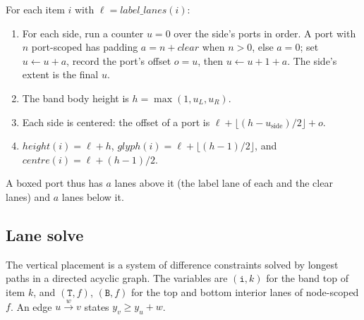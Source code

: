 \begin{algorithm}[Bands]\label{alg:pictorial-bands}
For each item $i$ with $\ell = \mathit{label\_lanes}(i)$:
\begin{enumerate}
  \item For each side, run a counter $u=0$ over the side's ports in order. A port with
    $n$ port-scoped \bboxes{} has padding $a = n + \mathit{clear}$ when $n>0$, else $a=0$; set
    $u \gets u + a$, record the port's offset $o = u$, then $u\gets u + 1 + a$. The side's
    extent is the final $u$.
  \item The band body height is $h = \max(1, u_L, u_R)$.
  \item Each side is centered: the offset of a port is $\ell + \lfloor(h - u_\text{side})/2\rfloor
    + o$.
  \item $\mathit{height}(i) = \ell + h$, $\mathit{glyph}(i) = \ell + \lfloor (h-1)/2\rfloor$,
    and $\mathit{centre}(i) = \ell + (h-1)/2$.
\end{enumerate}
A boxed port thus has $a$ lanes above it (the label lane of each \bbox{} and the clear lanes)
and $a$ lanes below it.
\end{algorithm}

\subsection{Lane solve}\label{sec:pictorial-solve}

The vertical placement is a system of difference constraints solved by longest paths in a
directed acyclic graph. The variables are $(\mathtt{i}, k)$ for the band top of item $k$, and
$(\mathtt{T}, f)$, $(\mathtt{B}, f)$ for the top and bottom interior lanes of node-scoped
\bbox{} $f$. An edge $u\xrightarrow{w}v$ states $y_v\ge y_u + w$.

